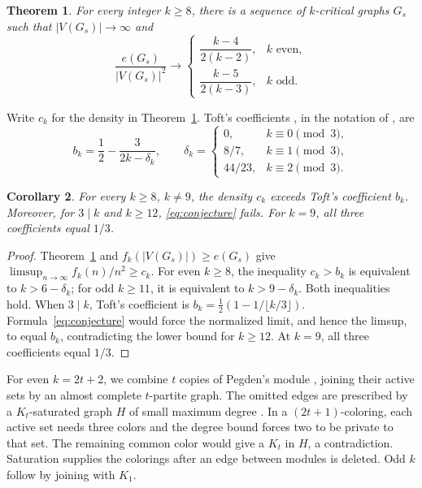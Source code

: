 \documentclass[11pt]{article}
\newtheorem{theorem}{Theorem}
\newtheorem{corollary}[theorem]{Corollary}
\numberwithin{equation}{section}
\begin{document}
\begin{theorem}\label{thm:main}
For every integer \(k\ge8\), there is a sequence of \(k\)-critical
graphs \(G_s\) such that \(|V(G_s)|\to\infty\) and
\[
 \frac{e(G_s)}{|V(G_s)|^2}\longrightarrow
 \begin{cases}
 \dfrac{k-4}{2(k-2)},&k\text{ even},\\[4pt]
 \dfrac{k-5}{2(k-3)},&k\text{ odd}.
 \end{cases}
\]
\end{theorem}

Write \(c_k\) for the density in Theorem~\ref{thm:main}.
Toft's coefficients \cite{Toft1970}, in the notation of
\cite[Section~1]{LMY}, are
\[
 b_k=\frac12-\frac3{2k-\delta_k},\qquad
 \delta_k=
 \begin{cases}
 0,&k\equiv0\pmod3,\\
 8/7,&k\equiv1\pmod3,\\
 44/23,&k\equiv2\pmod3.
 \end{cases}
\]

\begin{corollary}\label{cor:general}
For every \(k\ge8\), \(k\ne9\), the density \(c_k\) exceeds
Toft's coefficient \(b_k\). Moreover, for \(3\mid k\) and
\(k\ge12\), \eqref{eq:conjecture} fails.
For \(k=9\), all three coefficients equal \(1/3\).
\end{corollary}

\begin{proof}
Theorem~\ref{thm:main} and \(f_k(|V(G_s)|)\ge e(G_s)\) give
\(\limsup_{n\to\infty}f_k(n)/n^2\ge c_k\).
For even \(k\ge8\), the inequality \(c_k>b_k\) is equivalent
to \(k>6-\delta_k\); for odd \(k\ge11\), it is equivalent
to \(k>9-\delta_k\). Both inequalities hold.
When \(3\mid k\), Toft's coefficient is
\(b_k=\tfrac12(1-1/\lfloor k/3\rfloor)\).
Formula~\eqref{eq:conjecture} would force the normalized limit,
and hence the limsup, to equal \(b_k\), contradicting the
lower bound for \(k\ge12\).
At \(k=9\), all three coefficients equal \(1/3\).
\end{proof}

For even \(k=2t+2\), we combine \(t\) copies of Pegden's module
\cite{Pegden}, joining their active sets by an almost complete
\(t\)-partite graph. The omitted edges are prescribed by a
\(K_t\)-saturated graph \(H\) of small maximum degree \cite{AEHK}.
In a \((2t+1)\)-coloring, each active set needs three colors
and the degree bound forces two to be private to that set.
The remaining common color would give a \(K_t\) in \(H\),
a contradiction. Saturation supplies the colorings after an
edge between modules is deleted. Odd \(k\) follow by joining
with \(K_1\).
\end{document}
